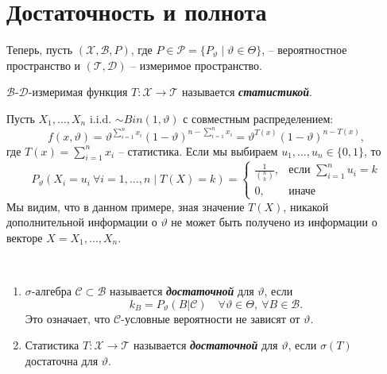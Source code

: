 \chapter{Достаточность и полнота}

Теперь, пусть $(\mathcal{X}, \mathcal{B}, P)$, где $P \in \mathcal{P} = \{P_\vartheta \mid \vartheta \in \Theta \} $, -- вероятностное пространство и $(\mathcal{T}, \mathcal{D})$ -- измеримое пространство.

\begin{defn}
	$\mathcal{B}$-$\mathcal{D}$-измеримая функция $T:\mathcal{X} \rightarrow \mathcal{T}$ называется \textbf{\textit{статистикой}}.
\end{defn}

\begin{exmp} \label{exmp4.2}
	Пусть $X_1, \dots, X_n$ i.i.d. $\sim Bin(1, \vartheta)$ с совместным распределением:
	\[ f(x, \vartheta) = \vartheta^{\sum_{i=1}^{n}x_i}(1-\vartheta)^{n-\sum_{i=1}^{n}x_i}=\vartheta^{T(x)}(1-\vartheta)^{n-T(x)}, \]
	где $T(x)=\sum_{i=1}^{n}x_i$ -- статистика.
	Если мы выбираем $u_1, \dots, u_n \in \{0,1\}$, то
	\[
		P_\vartheta(X_i=u_i \  \forall i = 1, \dots, n \mid T(X)=k)=\left \{
		\begin{array}{cl}
		\frac{1}{\binom{n}{k}}, & \text{если } \sum_{i=1}^{n}u_i=k \\
		0, & \text{иначе}
		\end{array}
		\right.
	\]
	Мы видим, что в данном примере, зная значение $T(X)$, никакой дополнительной информации о $\vartheta$ не может быть получено из информации о векторе $X=X_1, \dots, X_n$.
\end{exmp}

\begin{defn} \
	\begin{enumerate}
		\item $\sigma$-алгебра $\mathcal{C} \subset \mathcal{B}$ называется \textbf{\textit{достаточной}} для $\vartheta$, если
		\[ k_B=P_\vartheta(B | \mathcal{C}) \quad \forall \vartheta \in \Theta,\ \forall B \in \mathcal{B}. \]
		Это означает, что $\mathcal{C}$-условные вероятности не зависят от $\vartheta$.
		\item Статистика $T:\mathcal{X} \rightarrow \mathcal{T}$ называется \textbf{\textit{достаточной}} для $\vartheta$, если $\sigma(T)$ достаточна для $\vartheta$.
	\end{enumerate}
\end{defn}

